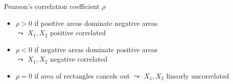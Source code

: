 \documentclass[10pt,compress,t,notes=noshow, xcolor=table]{beamer}
\begin{document}
\begin{frame}{Pearson's correlation coefficient $\rho$}
\medskip
\pause
\begin{itemize}
    \item $\rho > 0$ if {\color{ggblue}positive areas} dominate {\color{ggred}negative areas} 
    \\$\leadsto$ $X_1, X_2$ positive correlated
    \item $\rho < 0$ if {\color{ggred}negative areas} dominate {\color{ggblue}positive areas} 
    \\$\leadsto$ $X_1, X_2$ negative correlated
    \item $\rho = 0$ if area of rectangles cancels out
    $\leadsto$ $X_1, X_2$ linearly uncorrelated
\end{itemize}

\end{frame}
\end{document}
